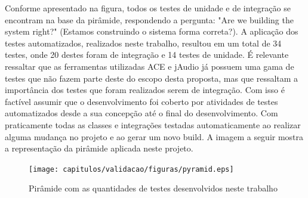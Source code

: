 Conforme apresentado na figura, todos os testes de unidade e de integração se encontram na base da pirâmide, respondendo a pergunta: "Are we building the system right?" (Estamos construindo o sistema forma correta?).  A  aplicação dos testes automatizados, realizados neste trabalho, resultou  em um total de 34 testes, onde 20 destes foram de integração e 14 testes de unidade. É relevante ressaltar que as ferramentas utilizadas ACE e jAudio já possuem uma gama de testes que não fazem parte deste do escopo desta proposta, mas que ressaltam a importância dos testes que foram realizados serem de integração. Com isso é factível assumir que o desenvolvimento foi coberto por atividades de testes automatizados desde a sua concepção até o final do desenvolvimento. Com praticamente todas as classes e integrações testadas automaticamente ao realizar alguma mudança no projeto e ao gerar um novo build. A imagem a seguir mostra a representação da pirâmide aplicada neste projeto. 

\begin{figure}[H]
	\centering
	\captionsetup{justification=centering,margin=2cm}
	\texttt{[image: capitulos/validacao/figuras/pyramid.eps]}
	\caption{Pirâmide com as quantidades de testes desenvolvidos neste trabalho}
	\label{fig:result-engajamento}
\end{figure}

